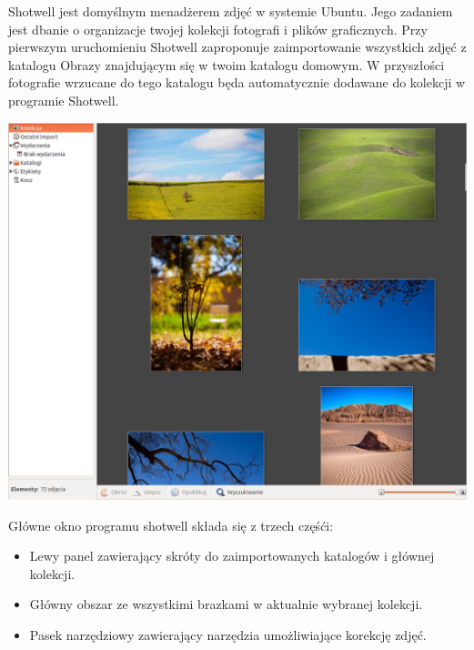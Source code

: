 Shotwell jest domyślnym menadżerem zdjęć w systemie Ubuntu. Jego zadaniem jest dbanie o organizacje twojej kolekcji fotografi i plików graficznych. Przy pierwszym uruchomieniu Shotwell zaproponuje zaimportowanie wszystkich zdjęć z katalogu Obrazy znajdującym się w twoim katalogu domowym. W przyszłości fotografie wrzucane do tego katalogu będa automatycznie dodawane do kolekcji w programie Shotwell.
\begin{center}
	\includegraphics[width=\linewidth]{images/programy_shotwell1.png}
\end{center}

Główne okno programu shotwell składa się z trzech częśći:
\begin{itemize}
\item \textcolor{ubuntu_orange}{Lewy panel} zawierający skróty do zaimportowanych katalogów i głównej kolekcji.
\item \textcolor{ubuntu_orange}{Główny obszar} ze wszystkimi brazkami w aktualnie wybranej kolekcji.
\item \textcolor{ubuntu_orange}{Pasek narzędziowy} zawierający narzędzia umożliwiające korekcję zdjęć.
\end{itemize}
